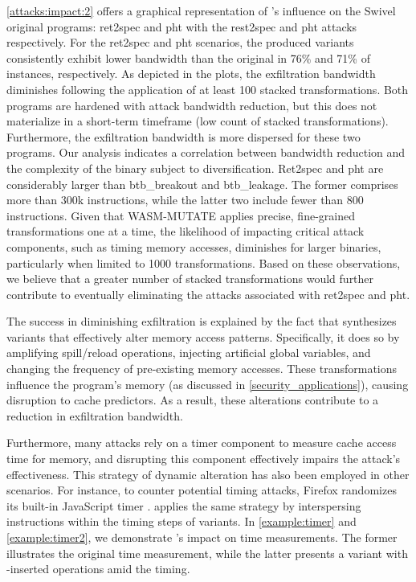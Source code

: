 \autoref{attacks:impact:2} offers a graphical representation of \tool's influence on the Swivel original programs: ret2spec and pht with the rest2spec and pht attacks respectively. 
For the ret2spec and pht scenarios, the produced variants consistently exhibit lower bandwidth than the original in 76\% and 71\% of instances, respectively.
As depicted in the plots, the exfiltration bandwidth diminishes following the application of at least  100 stacked transformations.
Both programs are hardened with attack bandwidth reduction, but this does not materialize in a short-term timeframe (low count of stacked transformations).
Furthermore,  the exfiltration bandwidth is more dispersed for these two programs.
Our analysis indicates a correlation between bandwidth reduction and the complexity of the binary subject to diversification.
Ret2spec and pht are considerably larger than btb\_breakout and btb\_leakage.
The former comprises more than 300k instructions, while the latter two include fewer than 800 instructions.
Given that WASM-MUTATE applies precise, fine-grained transformations one at a time, the likelihood of impacting critical attack components, such as timing memory accesses, diminishes for larger binaries, particularly when limited to 1000 transformations.
Based on these observations, we believe that a greater number of stacked transformations would further contribute to eventually eliminating the attacks associated with ret2spec and pht.

 The success in diminishing exfiltration is explained by the fact that \tool synthesizes variants that effectively alter memory access patterns. 
Specifically, it does so by amplifying spill/reload operations, injecting artificial global variables, and changing the frequency of pre-existing memory accesses. 
These transformations influence the \wasm program's memory (as discussed in \autoref{security_applications}), causing disruption to cache predictors. 
As a result, these alterations contribute to a reduction in exfiltration bandwidth.

 Furthermore, many attacks rely on a timer component to measure cache access time for memory, and disrupting this component  effectively impairs the attack's effectiveness. 
This strategy of dynamic alteration has also been  employed in other scenarios. 
For instance, to counter potential timing attacks, Firefox randomizes its built-in JavaScript timer \cite{10.1007/978-3-319-70972-7_13}. \tool applies the same strategy by interspersing instructions within the timing steps of \wasm variants. 
In \autoref{example:timer} and \autoref{example:timer2}, we demonstrate \tool's impact on time measurements. 
The former illustrates the original time measurement, while the latter presents a variant with \tool-inserted operations amid the timing.

